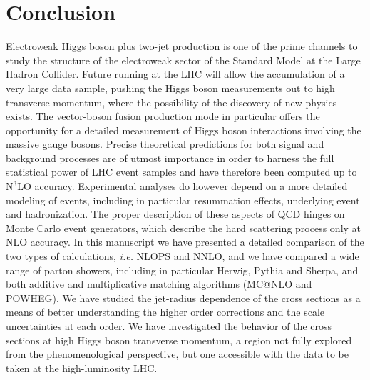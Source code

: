 \documentclass[10pt,prd,fleqn,superscriptaddress,notitlepage,nofootinbib,preprintnumbers,nobalancelastpage]{revtex4-1}
\begin{document}
\section{Conclusion}
\label{sec:conclusions}
Electroweak Higgs boson plus two-jet production is one of the prime channels to study the structure of the electroweak sector of the Standard Model at the Large Hadron Collider. Future running at the  LHC will allow the accumulation of a very large data sample, pushing the Higgs boson measurements out to high transverse momentum, where the possibility of the discovery of new physics exists. The vector-boson fusion production mode in particular offers the opportunity for a detailed measurement of Higgs boson interactions involving the massive gauge bosons. Precise theoretical predictions for both signal and background processes are of utmost importance in order to harness the full statistical power of LHC event samples and have therefore been computed up to N$^3$LO accuracy. Experimental analyses do however depend on a more detailed modeling of events, including in particular resummation effects, underlying event and hadronization. The proper description of these aspects of QCD hinges on Monte Carlo event generators, which describe the hard scattering process only at NLO accuracy. In this manuscript we have presented a detailed comparison of the two types of calculations, \emph{i.e.} NLOPS and NNLO, and we have compared a wide range of parton showers, including in particular Herwig, Pythia and Sherpa,
and both  additive and multiplicative matching algorithms (MC@NLO and POWHEG). We have studied the jet-radius dependence of the cross sections as a means of better understanding the higher order corrections and the scale uncertainties at each order. We have investigated the behavior of the cross sections at high Higgs boson transverse momentum, a region not fully explored from the phenomenological perspective, but one accessible with the data to be taken at the high-luminosity LHC.
\end{document}
